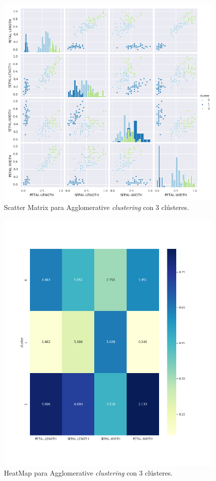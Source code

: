 \documentclass[a4paper, 20pt]{article}
\begin{document}
\begin{figure}[h]
\centering
\includegraphics[scale=0.64]{dani/scatmatrixAggClusterIRIS.png}
\caption{Scatter Matrix para Agglomerative \textit{clustering} con 3 clústeres.}
\label{smac}
\end{figure}

\clearpage

\begin{figure}[h]
\centering
\includegraphics[scale=0.63]{dani/heatmapAggClusterIRIS.png}
\caption{HeatMap para Agglomerative \textit{clustering} con 3 clústeres.}
\label{hmac}
\end{figure}
\end{document}
